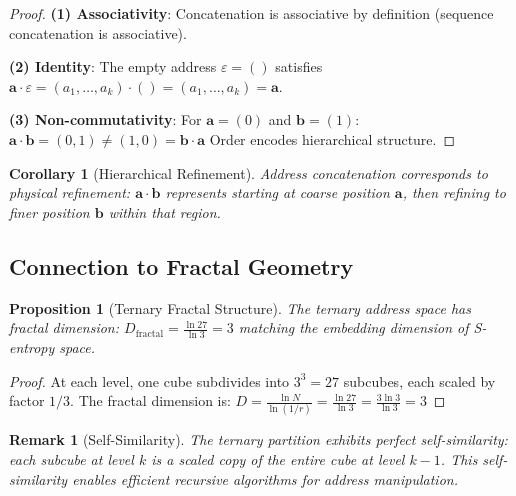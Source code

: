\documentclass[twocolumn,10pt]{article}
\newtheorem{proposition}[theorem]{Proposition}
\newtheorem{corollary}[theorem]{Corollary}
\newtheorem{remark}[theorem]{Remark}
\begin{document}
\begin{proof}
\textbf{(1) Associativity}: Concatenation is associative by definition (sequence concatenation is associative).

\textbf{(2) Identity}: The empty address $\varepsilon = ()$ satisfies $\mathbf{a} \cdot \varepsilon = (a_1, \ldots, a_k) \cdot () = (a_1, \ldots, a_k) = \mathbf{a}$.

\textbf{(3) Non-commutativity}: For $\mathbf{a} = (0)$ and $\mathbf{b} = (1)$:
$
\mathbf{a} \cdot \mathbf{b} = (0, 1) \neq (1, 0) = \mathbf{b} \cdot \mathbf{a}
$
Order encodes hierarchical structure.
\end{proof}

\begin{corollary}[Hierarchical Refinement]
\label{cor:refinement}
Address concatenation corresponds to physical refinement: $\mathbf{a} \cdot \mathbf{b}$ represents starting at coarse position $\mathbf{a}$, then refining to finer position $\mathbf{b}$ within that region.
\end{corollary}

\subsection{Connection to Fractal Geometry}

\begin{proposition}[Ternary Fractal Structure]
\label{prop:fractal}
The ternary address space has fractal dimension:
$
D_{\mathrm{fractal}} = \frac{\ln 27}{\ln 3} = 3
$
matching the embedding dimension of S-entropy space.
\end{proposition}

\begin{proof}
At each level, one cube subdivides into $3^3 = 27$ subcubes, each scaled by factor $1/3$. The fractal dimension is:
$
D = \frac{\ln N}{\ln(1/r)} = \frac{\ln 27}{\ln 3} = \frac{3\ln 3}{\ln 3} = 3
$
\end{proof}

\begin{remark}[Self-Similarity]
The ternary partition exhibits perfect self-similarity: each subcube at level $k$ is a scaled copy of the entire cube at level $k-1$. This self-similarity enables efficient recursive algorithms for address manipulation.
\end{remark}
\end{document}
